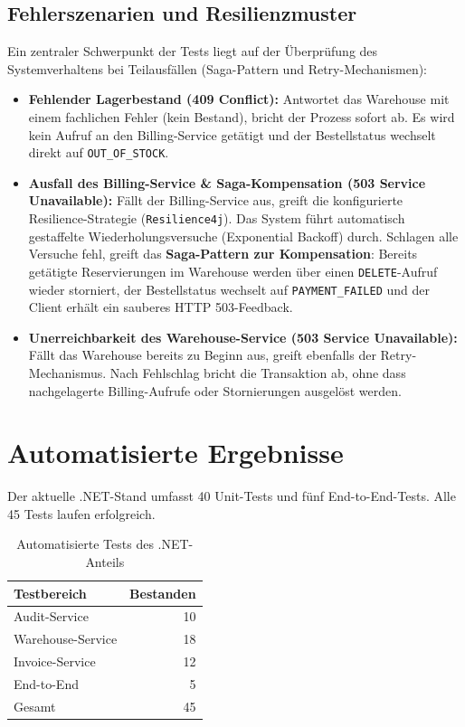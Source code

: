\documentclass[
  11pt,
  a4paper,
  oneside,
  headings=normal,
  parskip=half,
  DIV=12
]{scrreprt}
\begin{document}
\subsection{Fehlerszenarien und Resilienzmuster}
Ein zentraler Schwerpunkt der Tests liegt auf der Überprüfung des Systemverhaltens bei Teilausfällen (Saga-Pattern und Retry-Mechanismen):

\begin{itemize}
    \item \textbf{Fehlender Lagerbestand (409 Conflict):} Antwortet das Warehouse mit einem fachlichen Fehler (kein Bestand), bricht der Prozess sofort ab. Es wird kein Aufruf an den Billing-Service getätigt und der Bestellstatus wechselt direkt auf \texttt{OUT\_OF\_STOCK}.

    \item \textbf{Ausfall des Billing-Service \& Saga-Kompensation (503 Service Unavailable):} Fällt der Billing-Service aus, greift die konfigurierte Resilience-Strategie (\texttt{Resilience4j}). Das System führt automatisch gestaffelte Wiederholungsversuche (Exponential Backoff) durch. Schlagen alle Versuche fehl, greift das \textbf{Saga-Pattern zur Kompensation}: Bereits getätigte Reservierungen im Warehouse werden über einen \texttt{DELETE}-Aufruf wieder storniert, der Bestellstatus wechselt auf \texttt{PAYMENT\_FAILED} und der Client erhält ein sauberes HTTP 503-Feedback.


    \item \textbf{Unerreichbarkeit des Warehouse-Service (503 Service Unavailable):} Fällt das Warehouse bereits zu Beginn aus, greift ebenfalls der Retry-Mechanismus. Nach Fehlschlag bricht die Transaktion ab, ohne dass nachgelagerte Billing-Aufrufe oder Stornierungen ausgelöst werden.
\end{itemize}


\section{Automatisierte Ergebnisse}

Der aktuelle .NET-Stand umfasst 40 Unit-Tests und fünf End-to-End-Tests. Alle
45 Tests laufen erfolgreich.

\begin{table}[H]
  \centering
  \caption{Automatisierte Tests des .NET-Anteils
  \label{tab:tests}}
  \begin{tabularx}{0.78\textwidth}{Xr}
    \toprule
    Testbereich & Bestanden \\
    \midrule
    Audit-Service & 10 \\
    Warehouse-Service & 18 \\
    Invoice-Service & 12 \\
    End-to-End & 5 \\
    \midrule
    Gesamt & 45 \\
    \bottomrule
  \end{tabularx}
\end{table}
\end{document}
